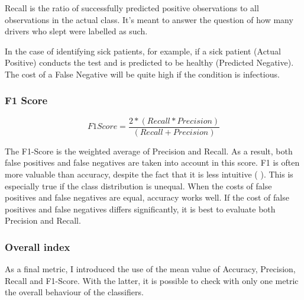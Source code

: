 Recall \cite{metrics2} is the ratio of successfully predicted positive observations to all observations in the actual class. It's meant to answer the question of how many drivers who slept were labelled as such.

In the case of identifying sick patients, for example, if a sick patient (Actual Positive) conducts the test and is predicted to be healthy (Predicted Negative). The cost of a False Negative will be quite high if the condition is infectious.

\subsubsection{F1 Score} \label{4F1}
\begin{equation}
    F1 Score = \frac{2*(Recall * Precision)}{(Recall + Precision)}
\end{equation}

The F1-Score is the weighted average of Precision and Recall. As a result, both false positives and false negatives are taken into account in this score. F1 is often more valuable than accuracy, despite the fact that it is less intuitive (\cite{metrics1} \cite{metrics2}). This is especially true if the class distribution is unequal. When the costs of false positives and false negatives are equal, accuracy works well. If the cost of false positives and false negatives differs significantly, it is best to evaluate both Precision and Recall.

\subsubsection{Overall index} \label{4overallindex}

As a final metric, I introduced the use of the mean value of Accuracy, Precision, Recall and F1-Score. With the latter, it is possible to check with only one metric the overall behaviour of the classifiers.




